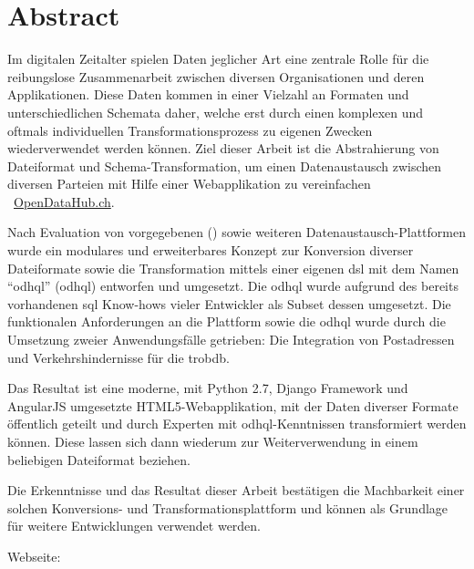 \begin{comment}
2.1.2 Abstract
Ein Abstract ist eine rein textuelle kurze Zusammenfassung der Arbeit. Der Abstract ist für die Recherche in grossen Dokumentensammlungen geeignet. Er umfasst nie mehr als eine Seite, typisch sogar nur etwa 200 Worte (etwa 20 Zeilen).
Der Begriff ‚Kurzfassung’ ist zuwenig genau definiert; er soll wenn möglich vermieden werden.
\end{comment}


{}
\chapter*{Abstract}

Im digitalen Zeitalter spielen Daten jeglicher Art eine zentrale Rolle für die reibungslose Zusammenarbeit zwischen diversen Organisationen und deren Applikationen. Diese Daten kommen in einer Vielzahl an Formaten und unterschiedlichen Schemata daher, welche erst durch einen komplexen und oftmals individuellen Transformationsprozess zu eigenen Zwecken wiederverwendet werden können. Ziel dieser Arbeit ist die Abstrahierung von Dateiformat und Schema-Transformation, um einen Datenaustausch zwischen diversen Parteien mit Hilfe einer Webapplikation zu vereinfachen \textendash\ \href{http://beta.opendatahub.ch/}{OpenDataHub.ch}.

\medskip
Nach Evaluation von vorgegebenen () sowie weiteren Datenaustausch-Plattformen wurde ein modulares und erweiterbares Konzept zur Konversion diverser Dateiformate sowie die Transformation mittels einer eigenen \gls{dsl} mit dem Namen ``\acl{odhql}'' (\acs{odhql}) entworfen und umgesetzt. Die \acs{odhql} wurde aufgrund des bereits vorhandenen \acs{sql} Know-hows vieler Entwickler als Subset dessen umgesetzt. Die funktionalen Anforderungen an die Plattform sowie die \acs{odhql} wurde durch die Umsetzung zweier Anwendungsfälle getrieben: Die Integration von Postadressen und Verkehrshindernisse für die \gls{trobdb}.

\medskip
Das Resultat ist eine moderne, mit Python 2.7, Django Framework und AngularJS umgesetzte HTML5-Webapplikation, mit der Daten diverser Formate öffentlich geteilt und durch Experten mit \acs{odhql}-Kenntnissen transformiert werden können. Diese lassen sich dann wiederum zur Weiterverwendung in einem beliebigen Dateiformat beziehen.

\medskip
Die Erkenntnisse und das Resultat dieser Arbeit bestätigen die Machbarkeit einer solchen Konversions- und Transformationsplattform und können als Grundlage für weitere Entwicklungen verwendet werden.

\bigskip
Webseite: 


\glsresetall